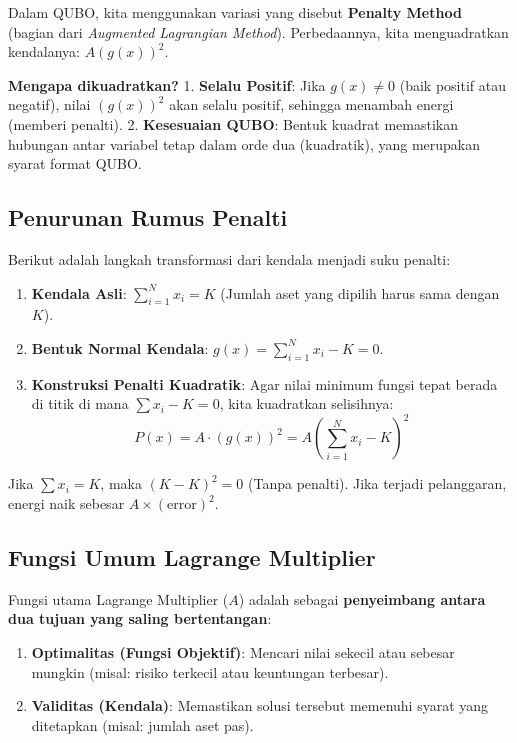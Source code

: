 Dalam QUBO, kita menggunakan variasi yang disebut \textbf{Penalty Method} (bagian dari \emph{Augmented Lagrangian Method}). Perbedaannya, kita menguadratkan kendalanya: \(A(g(x))^2\).

\textbf{Mengapa dikuadratkan?} 1. \textbf{Selalu Positif}: Jika \(g(x) \neq 0\) (baik positif atau negatif), nilai \((g(x))^2\) akan selalu positif, sehingga menambah energi (memberi penalti). 2. \textbf{Kesesuaian QUBO}: Bentuk kuadrat memastikan hubungan antar variabel tetap dalam orde dua (kuadratik), yang merupakan syarat format QUBO.

\hypertarget{penurunan-rumus-penalti}{%
\subsection{Penurunan Rumus Penalti}\label{penurunan-rumus-penalti}}

Berikut adalah langkah transformasi dari kendala menjadi suku penalti:

\begin{enumerate}
\def\labelenumi{\arabic{enumi}.}
\tightlist
\item
  \textbf{Kendala Asli}: \(\sum_{i=1}^N x_i = K\) (Jumlah aset yang dipilih harus sama dengan \(K\)).
\item
  \textbf{Bentuk Normal Kendala}: \(g(x) = \sum_{i=1}^N x_i - K = 0\).
\item
  \textbf{Konstruksi Penalti Kuadratik}: Agar nilai minimum fungsi tepat berada di titik di mana \(\sum x_i - K = 0\), kita kuadratkan selisihnya: \[ P(x) = A \cdot (g(x))^2 = A \left( \sum_{i=1}^N x_i - K \right)^2 \]
\end{enumerate}

Jika \(\sum x_i = K\), maka \((K - K)^2 = 0\) (Tanpa penalti). Jika terjadi pelanggaran, energi naik sebesar \(A \times (\text{error})^2\).

\hypertarget{fungsi-umum-lagrange-multiplier}{%
\subsection{Fungsi Umum Lagrange Multiplier}\label{fungsi-umum-lagrange-multiplier}}

Fungsi utama Lagrange Multiplier (\(A\)) adalah sebagai \textbf{penyeimbang antara dua tujuan yang saling bertentangan}:

\begin{enumerate}
\def\labelenumi{\arabic{enumi}.}
\tightlist
\item
  \textbf{Optimalitas (Fungsi Objektif)}: Mencari nilai sekecil atau sebesar mungkin (misal: risiko terkecil atau keuntungan terbesar).
\item
  \textbf{Validitas (Kendala)}: Memastikan solusi tersebut memenuhi syarat yang ditetapkan (misal: jumlah aset pas).
\end{enumerate}

